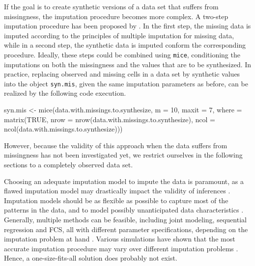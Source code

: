 \documentclass[psych,article,submit,moreauthors,pdftex]{mdpi}
\newenvironment{Shaded}{\begin{snugshade}}{\end{snugshade}}
\newcommand{\AttributeTok}[1]{\textcolor[rgb]{0.77,0.63,0.00}{#1}}
\newcommand{\ConstantTok}[1]{\textcolor[rgb]{0.00,0.00,0.00}{#1}}
\newcommand{\DecValTok}[1]{\textcolor[rgb]{0.00,0.00,0.81}{#1}}
\newcommand{\FunctionTok}[1]{\textcolor[rgb]{0.00,0.00,0.00}{#1}}
\newcommand{\NormalTok}[1]{#1}
\newcommand{\OtherTok}[1]{\textcolor[rgb]{0.56,0.35,0.01}{#1}}
\begin{document}
If the goal is to create synthetic versions of a data set that suffers
from missingness, the imputation procedure becomes more complex. A
two-step imputation procedure has been proposed by
\citet{reiter2004simultaneous}. In the first step, the missing data is
imputed according to the principles of multiple imputation for missing
data, while in a second step, the synthetic data is imputed conform the
corresponding procedure. Ideally, these steps could be combined using
\texttt{mice}, conditioning the imputations on both the missingness and
the values that are to be synthesized. In practice, replacing observed
and missing cells in a data set by synthetic values into the object
\texttt{syn.mis}, given the same imputation parameters as before, can be
realized by the following code execution.

\begin{Shaded}
\begin{Highlighting}[]
\NormalTok{syn.mis }\OtherTok{\textless{}{-}} \FunctionTok{mice}\NormalTok{(data.with.missings.to.synthesize, }
                \AttributeTok{m =} \DecValTok{10}\NormalTok{,}
                \AttributeTok{maxit =} \DecValTok{7}\NormalTok{, }
                \AttributeTok{where =} \FunctionTok{matrix}\NormalTok{(}\ConstantTok{TRUE}\NormalTok{, }
                               \AttributeTok{nrow =} \FunctionTok{nrow}\NormalTok{(data.with.missings.to.synthesize),}
                               \AttributeTok{ncol =} \FunctionTok{ncol}\NormalTok{(data.with.missings.to.synthesize)))}
\end{Highlighting}
\end{Shaded}

However, because the validity of this approach when the data suffers
from missingness has not been investigated yet, we restrict ourselves in
the following sections to a completely observed data set.

Choosing an adequate imputation model to impute the data is paramount,
as a flawed imputation model may drastically impact the validity of
inferences \citep{grund2021using, jiang2021balancing}. Imputation models
should be as flexible as possible to capture most of the patterns in the
data, and to model possibly unanticipated data characteristics
\citep{murray_multiple_2018, rubin_18years_1996}. Generally, multiple
methods can be feasible, including joint modeling, sequential regression
and FCS, all with different parameter specifications, depending on the
imputation problem at hand
\citep{ludtke2020regression, yucel2018sequential, murray2016multiple}.
Various simulations have shown that the most accurate imputation
procedure may vary over different imputation problems \citep[e.g., see][
for an overview]{hanne_review_2021}. Hence, a one-size-fits-all solution
does probably not exist.
\end{document}
